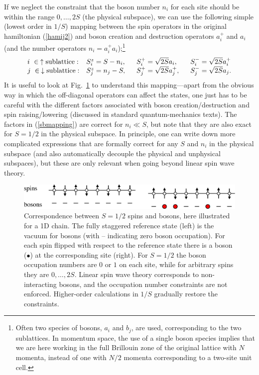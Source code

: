 \documentclass[draft,numberedheadings]{aipproc}
\newcommand{\dn}{\downarrow}
\newcommand{\up}{\uparrow}
\begin{document}
If we neglect the constraint that the boson number $n_i$ for each site should be within the range $0,\ldots,2S$ (the physical subspace), we can use 
the following simple (lowest order in $1/S$) mapping between the spin operators in the original hamiltonian (\ref{hamij2}) and boson creation and destruction 
operators $a^+_i$ and $a_i$ (and the number operators $n_i=a^+_ia_i$);\footnote{Often two species of bosons, $a_i$ and $b_j$, are used, corresponding to the 
two sublattices. In momentum space, the use of a single boson species implies that we are here working in the full Brillouin zone of the original lattice 
with $N$ momenta, instead of one with $N/2$ momenta corresponding to a two-site unit cell.} 
\begin{equation}
\begin{array}{llll}
i~ \in \hskip0.8mm\up{\rm sublattice:} & S^z_i=S-n_i,~~& S^+_i = \sqrt{2S}a_i,~~  & S^-_i = \sqrt{2S}a^+_i \\
j~ \in \hskip0.8mm\dn{\rm sublattice:} & S^z_j=n_j-S,~~& S^+_j = \sqrt{2S}a^+_j,~~& S^-_j = \sqrt{2S}a_j.
\end{array}
\label{sbmapping}
\end{equation}
It is useful to look at Fig.~\ref{spinbosons} to understand this mapping---apart from the obvious way in which the off-diagonal operators 
can affect the states, one just has to be careful with the different factors associated with boson creation/destruction and spin raising/lowering (discussed
in standard quantum-mechanics texts). The factors in (\ref{sbmapping}) are correct for $n_i \ll S$, but note that they are also exact for $S=1/2$ in the physical 
subspace. In principle, one can write down more complicated expressions that are formally correct for any $S$ and $n_i$ in the physical subspace (and also 
automatically decouple the physical and unphysical subspaces), but these are only relevant when going beyond linear spin wave theory.

\begin{figure}
\includegraphics[width=12cm, clip]{spinbosons.eps}
\caption{Correspondence between $S=1/2$ spins and bosons, here illustrated for a 1D chain. The fully staggered reference state (left) is the vacuum for bosons
(with -- indicating zero boson occupation). For each spin flipped with respect to the reference state there is a boson ($\bullet$) at the corresponding 
site (right). For $S=1/2$ the boson occupation numbers are $0$ or $1$ on each site, while for arbitrary spins they are $0,\ldots,2S$. Linear spin wave 
theory corresponds to non-interacting bosons, and the occupation number constraints are not enforced. Higher-order calculations in $1/S$ gradually 
restore the constraints.} 
\label{spinbosons}
\end{figure}
\end{document}
